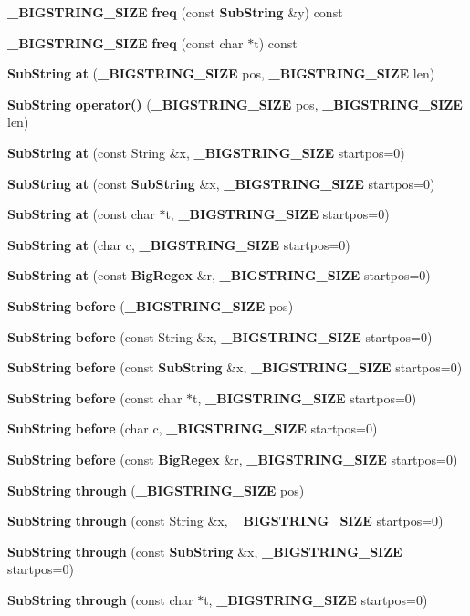 \begin{CompactItemize}
\item 
{\bf \_\-BIGSTRING\_\-SIZE} {\bf freq} (const {\bf Sub\-String} \&y) const
\item 
{\bf \_\-BIGSTRING\_\-SIZE} {\bf freq} (const char $\ast$t) const
\item 
{\bf Sub\-String} {\bf at} ({\bf \_\-BIGSTRING\_\-SIZE} pos, {\bf \_\-BIGSTRING\_\-SIZE} len)
\item 
{\bf Sub\-String} {\bf operator()} ({\bf \_\-BIGSTRING\_\-SIZE} pos, {\bf \_\-BIGSTRING\_\-SIZE} len)
\item 
{\bf Sub\-String} {\bf at} (const String \&x, {\bf \_\-BIGSTRING\_\-SIZE} startpos=0)
\item 
{\bf Sub\-String} {\bf at} (const {\bf Sub\-String} \&x, {\bf \_\-BIGSTRING\_\-SIZE} startpos=0)
\item 
{\bf Sub\-String} {\bf at} (const char $\ast$t, {\bf \_\-BIGSTRING\_\-SIZE} startpos=0)
\item 
{\bf Sub\-String} {\bf at} (char c, {\bf \_\-BIGSTRING\_\-SIZE} startpos=0)
\item 
{\bf Sub\-String} {\bf at} (const {\bf Big\-Regex} \&r, {\bf \_\-BIGSTRING\_\-SIZE} startpos=0)
\item 
{\bf Sub\-String} {\bf before} ({\bf \_\-BIGSTRING\_\-SIZE} pos)
\item 
{\bf Sub\-String} {\bf before} (const String \&x, {\bf \_\-BIGSTRING\_\-SIZE} startpos=0)
\item 
{\bf Sub\-String} {\bf before} (const {\bf Sub\-String} \&x, {\bf \_\-BIGSTRING\_\-SIZE} startpos=0)
\item 
{\bf Sub\-String} {\bf before} (const char $\ast$t, {\bf \_\-BIGSTRING\_\-SIZE} startpos=0)
\item 
{\bf Sub\-String} {\bf before} (char c, {\bf \_\-BIGSTRING\_\-SIZE} startpos=0)
\item 
{\bf Sub\-String} {\bf before} (const {\bf Big\-Regex} \&r, {\bf \_\-BIGSTRING\_\-SIZE} startpos=0)
\item 
{\bf Sub\-String} {\bf through} ({\bf \_\-BIGSTRING\_\-SIZE} pos)
\item 
{\bf Sub\-String} {\bf through} (const String \&x, {\bf \_\-BIGSTRING\_\-SIZE} startpos=0)
\item 
{\bf Sub\-String} {\bf through} (const {\bf Sub\-String} \&x, {\bf \_\-BIGSTRING\_\-SIZE} startpos=0)
\item 
{\bf Sub\-String} {\bf through} (const char $\ast$t, {\bf \_\-BIGSTRING\_\-SIZE} startpos=0)
\item 

\end{CompactItemize}
